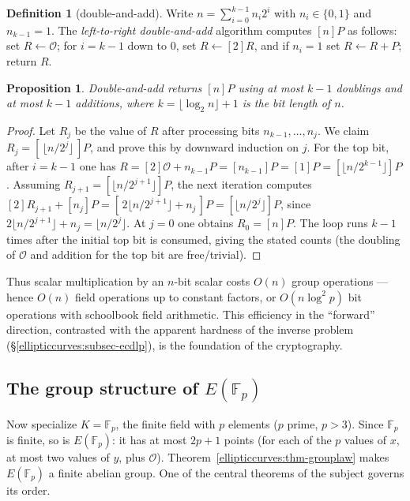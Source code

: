 \documentclass[11pt,a4paper]{article}
\newtheorem{proposition}[theorem]{Proposition}
\theoremstyle{definition}
\newtheorem{definition}[theorem]{Definition}
\theoremstyle{remark}
\newcommand{\Fp}{\ensuremath{\mathbb{F}_{p}}}
\begin{document}
\begin{definition}[double-and-add]\label{ellipticcurves:def-dbladd}
Write \(n = \sum_{i=0}^{k-1} n_i 2^i\) with \(n_i \in \{0,1\}\) and \(n_{k-1} = 1\). The \emph{left-to-right double-and-add} algorithm computes \([n]P\) as follows: set \(R \leftarrow \mathcal{O}\); for \(i = k-1\) down to \(0\), set \(R \leftarrow [2]R\), and if \(n_i = 1\) set \(R \leftarrow R + P\); return \(R\).
\end{definition}

\begin{proposition}\label{ellipticcurves:prop-dbladd}
Double-and-add returns \([n]P\) using at most \(k - 1\) doublings and at most \(k - 1\) additions, where \(k = \lfloor \log_2 n\rfloor + 1\) is the bit length of \(n\).
\end{proposition}

\begin{proof}
Let \(R_j\) be the value of \(R\) after processing bits \(n_{k-1}, \ldots, n_j\). We claim \(R_j = [\,\lfloor n / 2^{j}\rfloor\,]P\), and prove this by downward induction on \(j\). For the top bit, after \(i = k-1\) one has \(R = [2]\mathcal{O} + n_{k-1} P = [n_{k-1}]P = [1]P = [\lfloor n/2^{k-1}\rfloor]P\). Assuming \(R_{j+1} = [\lfloor n/2^{j+1}\rfloor]P\), the next iteration computes \([2]R_{j+1} + [n_j]P = [\,2\lfloor n/2^{j+1}\rfloor + n_j\,]P = [\lfloor n/2^{j}\rfloor]P\), since \(2\lfloor n/2^{j+1}\rfloor + n_j = \lfloor n/2^j\rfloor\). At \(j = 0\) one obtains \(R_0 = [n]P\). The loop runs \(k-1\) times after the initial top bit is consumed, giving the stated counts (the doubling of \(\mathcal{O}\) and addition for the top bit are free/trivial).
\end{proof}

Thus scalar multiplication by an \(n\)-bit scalar costs \(O(n)\) group operations --- hence \(O(n)\) field operations up to constant factors, or \(O(n \log^2 p)\) bit operations with schoolbook field arithmetic. This efficiency in the ``forward'' direction, contrasted with the apparent hardness of the inverse problem (\S\ref{ellipticcurves:subsec-ecdlp}), is the foundation of the cryptography.

\subsection{The group structure of \(E(\Fp)\)}

Now specialize \(K = \Fp\), the finite field with \(p\) elements (\(p\) prime, \(p > 3\)). Since \(\Fp\) is finite, so is \(E(\Fp)\): it has at most \(2p + 1\) points (for each of the \(p\) values of \(x\), at most two values of \(y\), plus \(\mathcal{O}\)). Theorem~\ref{ellipticcurves:thm-grouplaw} makes \(E(\Fp)\) a finite abelian group. One of the central theorems of the subject governs its order.
\end{document}
